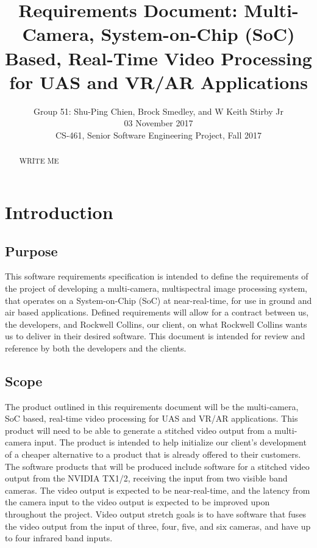 \documentclass[letterpaper,10pt,serif,draftclsnofoot,onecolumn,compsoc,titlepage]{IEEEtran}
\title{Requirements Document: Multi-Camera, System-on-Chip (SoC) Based, Real-Time Video Processing for UAS and VR/AR Applications}
\author{Group 51: Shu-Ping Chien, Brock Smedley, and W Keith Stirby Jr \\ 03 November 2017 \\ CS-461, Senior Software Engineering Project, Fall 2017}
\begin{document}
\begin{titlepage}
\maketitle
\begin{abstract}

WRITE ME \\

\end{abstract}
\end{titlepage}
\newpage

\tableofcontents
\newpage

\section{Introduction}

\subsection{Purpose}

This software requirements specification is intended to define the requirements of the 
project of developing a multi-camera, multispectral image processing system, that 
operates on a System-on-Chip (SoC) at near-real-time, for use in ground and air based 
applications. Defined requirements will allow for a contract between us, the 
developers, and Rockwell Collins, our client, on what Rockwell Collins wants us to 
deliver in their desired software. This document is intended for review and reference 
by both the developers and the clients.\\

\subsection{Scope}

The product outlined in this requirements document will be the multi-camera, SoC based,
 real-time video processing for UAS and VR/AR applications. This product will need to 
 be able to generate a stitched video output from a multi-camera input. The product is 
 intended to help initialize our client's development of a cheaper alternative to a 
 product that is already offered to their customers.\\

The software products that will be produced include software for a stitched video output 
from the NVIDIA TX1/2, receiving the input from two visible band cameras. 
The video output is expected to be near-real-time, and the latency from the camera 
input to the video output is expected to be improved upon throughout the project. Video 
output stretch goals is to have software that fuses the video output from the input of 
three, four, five, and six cameras, and have up to four infrared band inputs.\\
\end{document}
